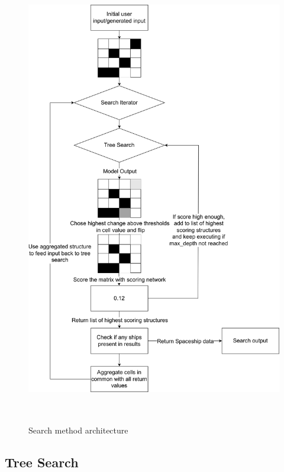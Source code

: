 \documentclass{l4proj}
\begin{document}
\begin{figure}[h!]
\centering
\includegraphics[width=0.9\linewidth, height=20cm]{dissertation/images/diagrams/spaceship_tree_search.jpg}
\caption{Search method architecture}
\label{fig:subim1}
\end{figure}

\subsection{Tree Search}
\end{document}
